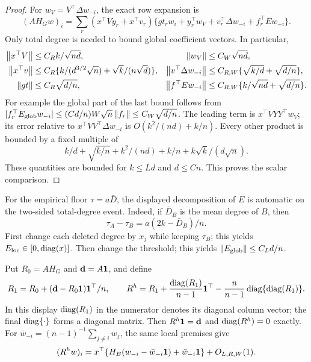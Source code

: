 \begin{proof}
For $w_V=V^\top\Delta w_{-i}$, the exact row expansion is
\[
 (AH_Gw)_i=
 \sum_r(x^\top Vy_r+x^\top v_r)
 \{g t_rw_i+y_r^\top w_V+v_r^\top\Delta w_{-i}
                                      +f_r^\top Ew_{-i}\}.
\]
Only total degree is needed to bound global coefficient vectors. In
particular,
\begin{align*}
 \left\lVert x^\top V\right\rVert&\le C_Rk/\sqrt{nd},&
 \left\lVert w_V\right\rVert&\le C_W\sqrt{nd},\\
 \left\lVert x^\top v\right\rVert&\le C_R\{k/(d^{3/2}\sqrt n)+\sqrt{k}/(n\sqrt d)\},&
 \left\lVert v^\top\Delta w_{-i}\right\rVert&\le C_{R,W}\{\sqrt{k/d}+\sqrt{d/n}\},\\
 \left\lVert gt\right\rVert&\le C_R\sqrt{d/n},&
 \left\lVert f^\top Ew_{-i}\right\rVert&\le C_{R,W}\{k/\sqrt{nd}+\sqrt{d/n}\}.
\end{align*}
For example the global part of the last bound follows from
$|f_r^\top E_\mathrm{glob}w_{-i}|
\le (Cd/n)W\sqrt n\left\lVert f_r\right\rVert\le C_W\sqrt{d/n}$.
The leading term is $x^\top VYY^\top w_V$; its error relative to
$x^\top VV^\top\Delta w_{-i}$ is
$O(k^2/(nd)+k/n)$. Every other product is bounded by a fixed
multiple of
\[
 k/d+\sqrt{k/n}+k^2/(nd)+k/n+k\sqrt{k}/(d\sqrt n).
\]
These quantities are bounded for $k\le Ld$ and $d\le Cn$.
This proves the scalar comparison.
\end{proof}

For the empirical floor $\tau=a\bar D$, the displayed decomposition of
$E$ is automatic on the two-sided total-degree event. Indeed, if
$\bar D_B$ is the mean degree of $B$, then
\[
 \tau_A-\tau_B=a(2k-\bar D_B)/n.
\]
First change each deleted degree by $x_j$ while keeping $\tau_B$;
this yields $E_\mathrm{loc}\in[0,\operatorname{diag}(x)]$. Then change the threshold;
this yields $\left\lVert E_\mathrm{glob}\right\rVert\le C_Ld/n$.

\begin{corollary}
\label{restore:loo-corrected}
Put $R_0=AH_G$ and $\mathbf d=A\mathbf 1$, and define
\begin{equation}\label{restore:reconstruction}
 R_1=R_0+(\mathbf d-R_0\mathbf 1)\mathbf 1^\top/n,\qquad
 R^h=R_1+\frac{\operatorname{diag}(R_1)}{n-1}\mathbf 1^\top
                -\frac n{n-1}\operatorname{diag}\{\operatorname{diag}(R_1)\}.
\end{equation}
In this display $\operatorname{diag}(R_1)$ in the numerator denotes its diagonal
column vector; the final $\operatorname{diag}\{\cdot\}$ forms a diagonal matrix.
Then $R^h\mathbf 1=\mathbf d$ and $\operatorname{diag}(R^h)=0$ exactly.
For $\bar w_{-i}=(n-1)^{-1}\sum_{j\ne i}w_j$, the same local premises
give
\begin{equation}\label{restore:loo-corrected-action}
 (R^h w)_i
 =x^\top\{H_B(w_{-i}-\bar w_{-i}\mathbf 1)+\bar w_{-i}\mathbf 1\}
       +O_{L,R,W}(1).
\end{equation}
\end{corollary}

